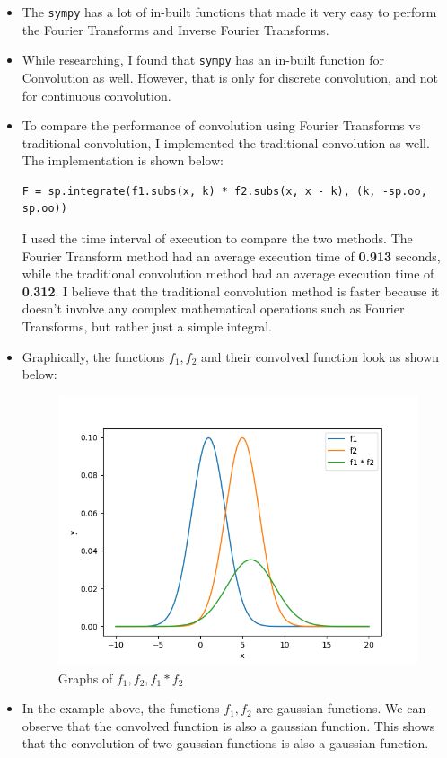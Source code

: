 \documentclass[12pt]{report}
\begin{document}
\begin{itemize}
    \item The \texttt{sympy} has a lot of in-built functions that made it very easy to perform the Fourier Transforms and Inverse Fourier Transforms.
    \item While researching, I found that \texttt{sympy} has an in-built function for Convolution as well. However, that is only for discrete convolution, and not for continuous convolution.
    \item To compare the performance of convolution using Fourier Transforms vs traditional convolution, I implemented the traditional convolution as well. The implementation is shown below:

          \begin{lstlisting}
F = sp.integrate(f1.subs(x, k) * f2.subs(x, x - k), (k, -sp.oo, sp.oo))
        \end{lstlisting}
          I used the time interval of execution to compare the two methods. The Fourier Transform method had an average execution time of \textbf{0.913} seconds, while the traditional convolution method had an average execution time of \textbf{0.312}. I believe that the traditional convolution method is faster because it doesn't involve any complex mathematical operations such as Fourier Transforms, but rather just a simple integral.
    \item Graphically, the functions $f_1, f_2$ and their convolved function look as shown below:

          \begin{figure}[H]
              \centering
              \includegraphics{Figure_1.png}
              \caption{Graphs of $f_1, f_2, f_1 \ast f_2$}
          \end{figure}
    \item In the example above, the functions $f_1, f_2$ are gaussian functions. We can observe that the convolved function is also a gaussian function. This shows that the convolution of two gaussian functions is also a gaussian function.
\end{itemize}
\end{document}
